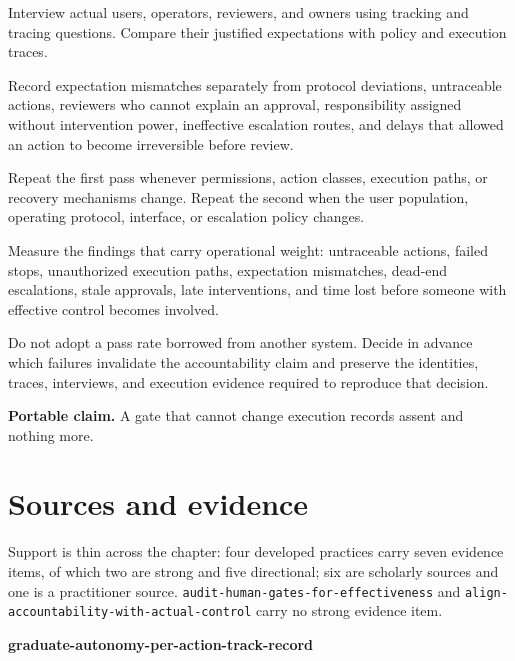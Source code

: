 Interview actual users, operators, reviewers, and owners using tracking and tracing questions. Compare their justified expectations with policy and execution traces.

Record expectation mismatches separately from protocol deviations, untraceable actions, reviewers who cannot explain an approval, responsibility assigned without intervention power, ineffective escalation routes, and delays that allowed an action to become irreversible before review.

Repeat the first pass whenever permissions, action classes, execution paths, or recovery mechanisms change. Repeat the second when the user population, operating protocol, interface, or escalation policy changes.

Measure the findings that carry operational weight: untraceable actions, failed stops, unauthorized execution paths, expectation mismatches, dead-end escalations, stale approvals, late interventions, and time lost before someone with effective control becomes involved.

Do not adopt a pass rate borrowed from another system. Decide in advance which failures invalidate the accountability claim and preserve the identities, traces, interviews, and execution evidence required to reproduce that decision.

\textbf{Portable claim.} A gate that cannot change execution records assent and nothing more.

\section*{Sources and evidence}

Support is thin across the chapter: four developed practices carry seven evidence items, of which two are strong and five directional; six are scholarly sources and one is a practitioner source. \texttt{audit-human-gates-for-effectiveness} and \texttt{align-accountability-with-actual-control} carry no strong evidence item.

\textbf{graduate-autonomy-per-action-track-record}

